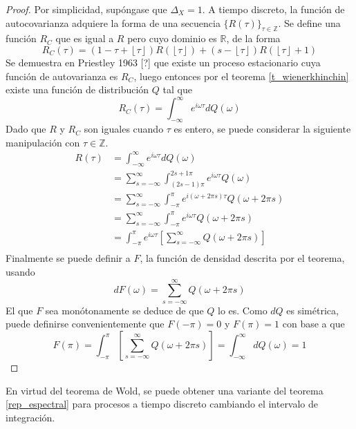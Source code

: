 \documentclass[12pt,letterpaper,draft]{book}
\newcommand{\R}{\mathbb{R}}
\newcommand{\Z}{\mathbb{Z}}
\newcommand{\intR}{\int_{-\infty}^{\infty}}
\newcommand{\intPI}{\int_{-\pi}^{\pi}}
\newcommand{\entero}[1]{\left\lfloor #1 \right\rfloor}
\begin{document}
\begin{proof}
Por simplicidad, supóngase que $\Delta_X=1$. A tiempo discreto, la función de autocovarianza adquiere la forma de una secuencia $\{R(\tau)\}_{\tau\in \Z}$. Se define una función $R_C$ que es igual a $R$ pero cuyo dominio es $\R$, de la forma
\begin{equation}
R_C(\tau) = \left( 1 - \tau + \entero{\tau} \right) R\left( \entero{\tau} \right) +
\left( s - \entero{\tau} \right) R\left( \entero{\tau} +1 \right)
\end{equation}
Se demuestra en Priestley 1963 [?] que existe un proceso estacionario cuya función de autovarianza es $R_C$, luego entonces por el teorema \ref{t_wienerkhinchin} existe una función de distribución $Q$ tal que 
\begin{equation}
R_C(\tau) = \intR e^{i \omega \tau} dQ(\omega)
\end{equation}
Dado que $R$ y $R_C$ son iguales cuando $\tau$ es entero, se puede considerar la siguiente manipulación con $\tau \in \Z$.
\begin{align*}
R(\tau) &= 
\intR e^{i \omega \tau} dQ(\omega) \\
&=
\sum_{s = -\infty}^{\infty} \int_{(2s-1)\pi}^{2s+1 \pi} e^{i \omega \tau} Q(\omega) \\
&=
\sum_{s = -\infty}^{\infty} \int_{-\pi}^{\pi} e^{i \left(\omega + 2\pi s \right) \tau} Q(\omega + 2 \pi s) \\
&=
\sum_{s = -\infty}^{\infty} \int_{-\pi}^{\pi} e^{i \omega \tau} Q(\omega + 2 \pi s) \\
&=
\int_{-\pi}^{\pi} e^{i \omega \tau} \left[ \sum_{s = -\infty}^{\infty} Q(\omega + 2 \pi s) \right] \\
\end{align*}
Finalmente se puede definir a $F$, la función de densidad descrita por el teorema, usando
\begin{equation}
dF(\omega) = \sum_{s = -\infty}^{\infty} Q(\omega + 2 \pi s)
\end{equation}
El que $F$ sea monótonamente se deduce de que $Q$ lo es. Como $dQ$ es simétrica, puede definirse convenientemente que $F(-\pi)=0$ y $F(\pi) = 1$ con base a que
\begin{equation}
F(\pi) = \intPI \left[ \sum_{s = -\infty}^{\infty} Q(\omega + 2 \pi s) \right] = \intR dQ(\omega) = 1
\end{equation}
\end{proof}

En virtud del teorema de Wold, se puede obtener una variante del teorema \ref{rep_espectral} para procesos a tiempo discreto cambiando el intervalo de integración.
\end{document}
